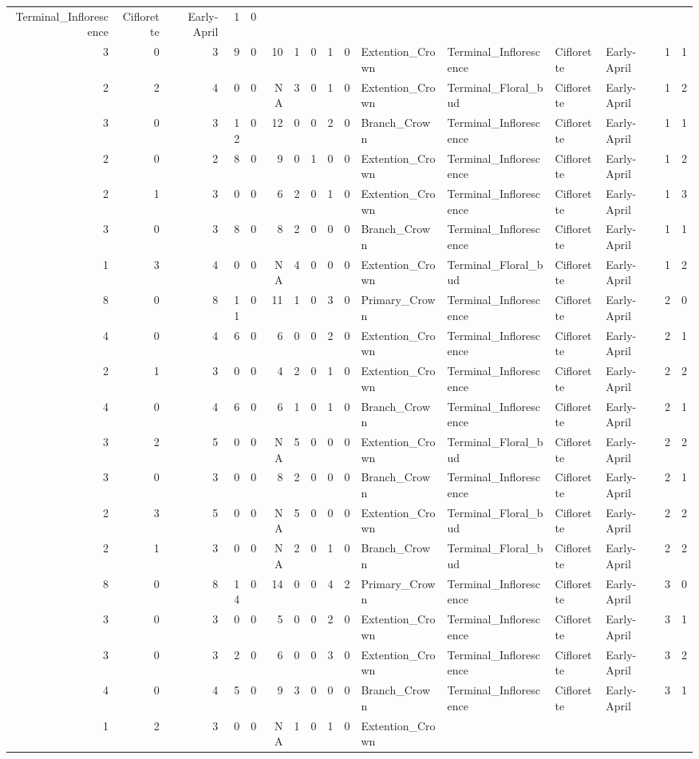 \documentclass[]{article}
\begin{document}
\begin{longtable}[]{@{}rrrrrrrrrrllllrl@{}}
Terminal\_Inflorescence & Ciflorette & Early-April & 1 &
0\tabularnewline
3 & 0 & 3 & 9 & 0 & 10 & 1 & 0 & 1 & 0 & Extention\_Crown &
Terminal\_Inflorescence & Ciflorette & Early-April & 1 &
1\tabularnewline
2 & 2 & 4 & 0 & 0 & NA & 3 & 0 & 1 & 0 & Extention\_Crown &
Terminal\_Floral\_bud & Ciflorette & Early-April & 1 & 2\tabularnewline
3 & 0 & 3 & 12 & 0 & 12 & 0 & 0 & 2 & 0 & Branch\_Crown &
Terminal\_Inflorescence & Ciflorette & Early-April & 1 &
1\tabularnewline
2 & 0 & 2 & 8 & 0 & 9 & 0 & 1 & 0 & 0 & Extention\_Crown &
Terminal\_Inflorescence & Ciflorette & Early-April & 1 &
2\tabularnewline
2 & 1 & 3 & 0 & 0 & 6 & 2 & 0 & 1 & 0 & Extention\_Crown &
Terminal\_Inflorescence & Ciflorette & Early-April & 1 &
3\tabularnewline
3 & 0 & 3 & 8 & 0 & 8 & 2 & 0 & 0 & 0 & Branch\_Crown &
Terminal\_Inflorescence & Ciflorette & Early-April & 1 &
1\tabularnewline
1 & 3 & 4 & 0 & 0 & NA & 4 & 0 & 0 & 0 & Extention\_Crown &
Terminal\_Floral\_bud & Ciflorette & Early-April & 1 & 2\tabularnewline
8 & 0 & 8 & 11 & 0 & 11 & 1 & 0 & 3 & 0 & Primary\_Crown &
Terminal\_Inflorescence & Ciflorette & Early-April & 2 &
0\tabularnewline
4 & 0 & 4 & 6 & 0 & 6 & 0 & 0 & 2 & 0 & Extention\_Crown &
Terminal\_Inflorescence & Ciflorette & Early-April & 2 &
1\tabularnewline
2 & 1 & 3 & 0 & 0 & 4 & 2 & 0 & 1 & 0 & Extention\_Crown &
Terminal\_Inflorescence & Ciflorette & Early-April & 2 &
2\tabularnewline
4 & 0 & 4 & 6 & 0 & 6 & 1 & 0 & 1 & 0 & Branch\_Crown &
Terminal\_Inflorescence & Ciflorette & Early-April & 2 &
1\tabularnewline
3 & 2 & 5 & 0 & 0 & NA & 5 & 0 & 0 & 0 & Extention\_Crown &
Terminal\_Floral\_bud & Ciflorette & Early-April & 2 & 2\tabularnewline
3 & 0 & 3 & 0 & 0 & 8 & 2 & 0 & 0 & 0 & Branch\_Crown &
Terminal\_Inflorescence & Ciflorette & Early-April & 2 &
1\tabularnewline
2 & 3 & 5 & 0 & 0 & NA & 5 & 0 & 0 & 0 & Extention\_Crown &
Terminal\_Floral\_bud & Ciflorette & Early-April & 2 & 2\tabularnewline
2 & 1 & 3 & 0 & 0 & NA & 2 & 0 & 1 & 0 & Branch\_Crown &
Terminal\_Floral\_bud & Ciflorette & Early-April & 2 & 2\tabularnewline
8 & 0 & 8 & 14 & 0 & 14 & 0 & 0 & 4 & 2 & Primary\_Crown &
Terminal\_Inflorescence & Ciflorette & Early-April & 3 &
0\tabularnewline
3 & 0 & 3 & 0 & 0 & 5 & 0 & 0 & 2 & 0 & Extention\_Crown &
Terminal\_Inflorescence & Ciflorette & Early-April & 3 &
1\tabularnewline
3 & 0 & 3 & 2 & 0 & 6 & 0 & 0 & 3 & 0 & Extention\_Crown &
Terminal\_Inflorescence & Ciflorette & Early-April & 3 &
2\tabularnewline
4 & 0 & 4 & 5 & 0 & 9 & 3 & 0 & 0 & 0 & Branch\_Crown &
Terminal\_Inflorescence & Ciflorette & Early-April & 3 &
1\tabularnewline
1 & 2 & 3 & 0 & 0 & NA & 1 & 0 & 1 & 0 & Extention\_Crown &

\end{longtable}
\end{document}
